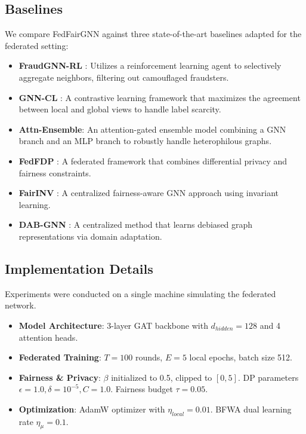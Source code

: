 \subsection{Baselines}
We compare FedFairGNN against three state-of-the-art baselines adapted for the federated setting:
\begin{itemize}
    \item \textbf{FraudGNN-RL} \cite{dou2020enhancing}: Utilizes a reinforcement learning agent to selectively aggregate neighbors, filtering out camouflaged fraudsters.
    \item \textbf{GNN-CL} \cite{sun2021dual}: A contrastive learning framework that maximizes the agreement between local and global views to handle label scarcity.
    \item \textbf{Attn-Ensemble}: An attention-gated ensemble model combining a GNN branch and an MLP branch to robustly handle heterophilous graphs.
    \item \textbf{FedFDP} \cite{ling2024feddp}: A federated framework that combines differential privacy and fairness constraints.
    \item \textbf{FairINV} \cite{zhu2024fairinv}: A centralized fairness-aware GNN approach using invariant learning.
    \item \textbf{DAB-GNN} \cite{lee2025dabgnn}: A centralized method that learns debiased graph representations via domain adaptation.
\end{itemize}

\subsection{Implementation Details}
Experiments were conducted on a single machine simulating the federated network.
\begin{itemize}
    \item \textbf{Model Architecture}: 3-layer GAT backbone with $d_{hidden}=128$ and 4 attention heads.
    \item \textbf{Federated Training}: $T=100$ rounds, $E=5$ local epochs, batch size 512.
    \item \textbf{Fairness \& Privacy}: $\beta$ initialized to 0.5, clipped to $[0, 5]$. DP parameters $\epsilon=1.0, \delta=10^{-5}, C=1.0$. Fairness budget $\tau=0.05$.
    \item \textbf{Optimization}: AdamW optimizer with $\eta_{local}=0.01$. BFWA dual learning rate $\eta_{\mu}=0.1$.
\end{itemize}

